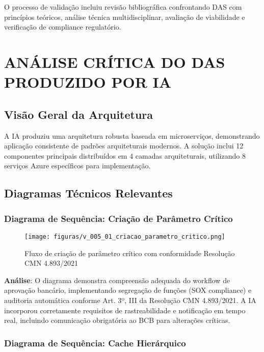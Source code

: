 O processo de validação incluiu revisão bibliográfica confrontando DAS com princípios teóricos, análise técnica multidisciplinar, avaliação de viabilidade e verificação de compliance regulatório.

\chapter{ANÁLISE CRÍTICA DO DAS PRODUZIDO POR IA}

\section{Visão Geral da Arquitetura}

A IA produziu uma arquitetura robusta baseada em microserviços, demonstrando aplicação consistente de padrões arquiteturais modernos. A solução inclui 12 componentes principais distribuídos em 4 camadas arquiteturais, utilizando 8 serviços Azure específicos para implementação.

\section{Diagramas Técnicos Relevantes}

\subsection{Diagrama de Sequência: Criação de Parâmetro Crítico}

\begin{figure}[h]
    \centering
    \texttt{[image: figuras/v\_005\_01\_criacao\_parametro\_critico.png]} 
    \caption{Fluxo de criação de parâmetro crítico com conformidade Resolução CMN 4.893/2021}
    \label{fig:v_005_01_criacao_parametro_critico}
\end{figure}

\textbf{Análise}: O diagrama demonstra compreensão adequada do workflow de aprovação bancário, implementando segregação de funções (SOX compliance) e auditoria automática conforme Art. 3º, III da Resolução CMN 4.893/2021. A IA incorporou corretamente requisitos de rastreabilidade e notificação em tempo real, incluindo comunicação obrigatória ao BCB para alterações críticas.

\subsection{Diagrama de Sequência: Cache Hierárquico}

